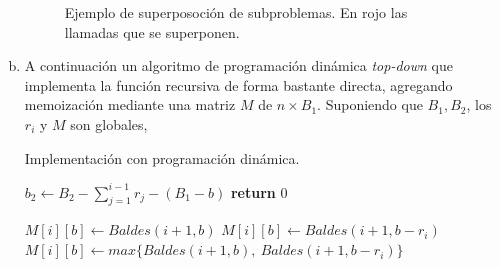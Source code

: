 \documentclass[12pt, a4paper]{report}
\theoremstyle{definition} %
\begin{document}
\begin{enumerate}[a)]
    \begin{figure}[H]
        \centering
        \caption{Ejemplo de superposoción de subproblemas. En rojo las llamadas que se superponen.}
    \end{figure}

    \item A continuación un algoritmo de programación dinámica \textit{top-down} que implementa la función recursiva de forma bastante directa, agregando memoización mediante una matriz $M$ de $n \times B_1$. Suponiendo que $B_1, B_2$, los $r_i$ y $M$ son globales,
    
    \begin{algorithm}[H]
        \caption{Implementación con programación dinámica.}
        \begin{algorithmic}[1]
                \State $b_2\gets B_2 - \sum_{j=1}^{i-1} r_j - (B_1 - b)$ 
                    \State \textbf{return} 0
                \EndIf

                 
                        \State $M[i][b] \gets Baldes(i + 1, b)$
                        \State $M[i][b] \gets Baldes(i + 1, b - r_i)$
                    \Else
                        \State $M[i][b] \gets max\{Baldes(i+1, b),\ Baldes(i+1, b - r_i)\}$
                    \EndIf
                \EndIf


\end{algorithmic}
\end{algorithm}
\end{enumerate}
\end{document}
